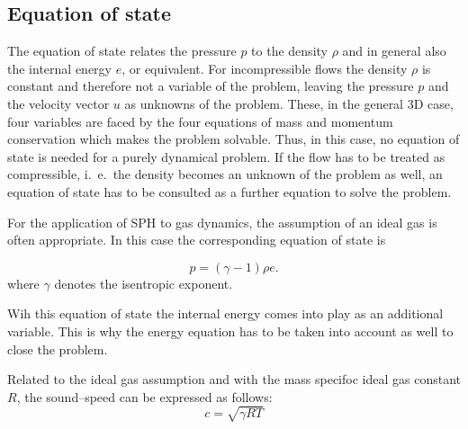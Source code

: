 \documentclass[11pt,a4paper,twoside]{report}
\begin{document}


\subsection{Equation of state}

The equation of state relates the pressure $p$ 
to the density $\rho$ and in general also the internal energy $e$, or equivalent.
For incompressible flows the density $\rho$ is constant and therefore not a variable of the problem, leaving the pressure $p$ and the velocity vector $u$ as unknowns of the problem. These, in the general 3D case, four variables are faced by the four equations of mass and momentum conservation which makes the problem solvable. Thus, in this case,  no equation of state is needed for a purely dynamical problem. If the flow has to be treated as compressible, i.\ e.\ the density becomes an unknown of the problem as well, an equation of state has to be consulted as a further equation to solve the problem.  

For the application of SPH to gas dynamics, the assumption of an ideal gas is often appropriate.
In this case the corresponding equation of state is

\begin{equation}
\label{eq:idealGasEqState}
 p=(\gamma-1)\rho e.
\end{equation}
where $\gamma$ denotes the isentropic exponent.

Wih this equation of state the internal energy comes into play as an additional variable. This is why the energy equation has to be taken into account as well to close the problem.

Related to the ideal gas assumption and with the mass specifoc ideal gas constant $R$, the sound--speed can be expressed as follows:
\begin{equation}
\label{eq:soundSpeed}
 c=\sqrt{\gamma R T}
\end{equation}
\end{document}
